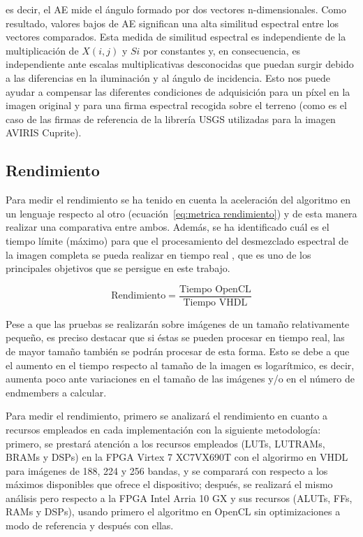es decir, el AE mide el ángulo formado por dos vectores n-dimensionales. Como resultado, valores bajos de AE significan una alta similitud espectral entre los vectores comparados. Esta medida de similitud espectral es independiente de la multiplicación de $X(i, j)$ y $Si$ por constantes y, en consecuencia, es independiente ante escalas multiplicativas desconocidas que puedan surgir debido a las diferencias en la iluminación y al ángulo de incidencia. Esto nos puede ayudar a compensar las diferentes condiciones de adquisición para un píxel en la imagen original y para una firma espectral recogida sobre el terreno (como es el caso de las firmas de referencia de la librería USGS utilizadas para la imagen AVIRIS Cuprite).

\subsection{Rendimiento}

Para medir el rendimiento se ha tenido en cuenta la aceleración del algoritmo en un lenguaje respecto al otro (ecuación~\ref{eq:metrica rendimiento}) y de esta manera realizar una comparativa entre ambos. Además, se ha identificado cuál es el tiempo límite (máximo) para que el procesamiento del desmezclado espectral de la imagen completa se pueda realizar en tiempo real \cite{tfg_miguel_carlos}, que es uno de los principales objetivos que se persigue en este trabajo.

\begin{equation}\label{eq:metrica rendimiento}
\text{Rendimiento} = \frac{\text{Tiempo OpenCL}}{\text{Tiempo VHDL}}
\end{equation}


Pese a que las pruebas se realizarán sobre imágenes de un tamaño relativamente pequeño, es preciso destacar que si éstas se pueden procesar en tiempo real, las de mayor tamaño también se podrán procesar de esta forma. Esto se debe a que el aumento en el tiempo respecto al tamaño de la imagen es logarítmico, es decir, aumenta poco ante variaciones en el tamaño de las imágenes y/o en el número de endmembers a calcular.

Para medir el rendimiento, primero se analizará el rendimiento en cuanto a recursos empleados en cada implementación con la siguiente metodología: primero, se prestará atención a los recursos empleados (LUTs, LUTRAMs, BRAMs y DSPs) en la FPGA Virtex 7 XC7VX690T con el algorirmo en VHDL para imágenes de 188, 224 y 256 bandas, y se comparará con respecto a los máximos disponibles que ofrece el dispositivo; después, se realizará el mismo análisis pero respecto a la FPGA Intel Arria 10 GX y sus recursos (ALUTs, FFs, RAMs y DSPs), usando primero el algoritmo en OpenCL sin optimizaciones a modo de referencia y después con ellas.

